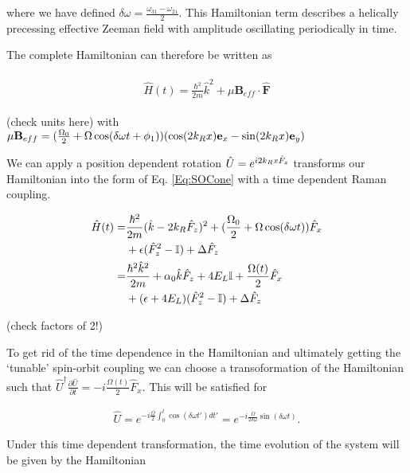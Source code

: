 where we have defined $\delta\omega=\frac{\omega_{31}-\omega_{21}}{2}$. This Hamiltonian term describes a helically precessing effective Zeeman field with amplitude oscillating periodically in time. 

The complete Hamiltonian can therefore be written as

\begin{align}
	\begin{split}
		\hat{H}(t)=\frac{\hbar^2}{2m}\hat{k}^2 + \mu\mathbf{B}_{eff}\cdot\hat{\mathbf{F}}
		\label{Eq:Beff}
	\end{split}
\end{align}

(check units here)
with $\mu\mathbf{B}_{eff}=(\frac{\Omega_0}{2} + \Omega\cos(\delta\omega t+\phi_1))(\cos(2{{k_R}} x)\mathbf{e}_x-\sin(2{{k_R}} x)\mathbf{e}_y)$


We can apply a position dependent rotation $\hat{U} = e^{i2{{k_R}} x \hat{F}_z}$ transforms our Hamiltonian into the form of Eq. \ref{Eq:SOCone} with a time dependent Raman coupling.

\begin{align}
	\begin{split}
		\hat{H}(t) = & \frac{\hbar^2}{2m}(\hat{k}-2{{k_R}}\hat{F}_z)^2 + (\frac{\Omega_0}{2} + \Omega\cos(\delta\omega t))\hat{F}_x \\& + \epsilon(\hat{F}_z^2-\mathbb{I})+\Delta\hat{F}_z \\
		=&\frac{\hbar^2\hat{k}^2}{2m} + \alpha_0\hat{k}\hat{F}_z +4E_L\mathbb{I} + \frac{\Omega(t)}{2}\hat{F}_x\\
		& +(\epsilon+4E_L)(\hat{F}_z^2-\mathbb{I}) +\Delta\hat{F}_z 
	\end{split}
\end{align}

(check factors of 2!)

To get rid of the time dependence in the Hamiltonian and ultimately getting the `tunable' spin-orbit coupling we can choose a transoformation of the Hamiltonian such that $\hat{U}^{\dagger} \frac{\partial\hat{U}}{\partial t} = -i \frac{\Omega(t)}{2}\hat{F}_x$. This will be satisfied for

\begin{align}
	\hat{U} = e^{-i\frac{\Omega}{2}\int_0^t\cos(\delta\omega t')dt'} = e^{-i\frac{\Omega}{2\delta\omega}\sin(\delta\omega t)}.
\end{align}

Under this time dependent transformation, the time evolution of the system will be given by the Hamiltonian
%

